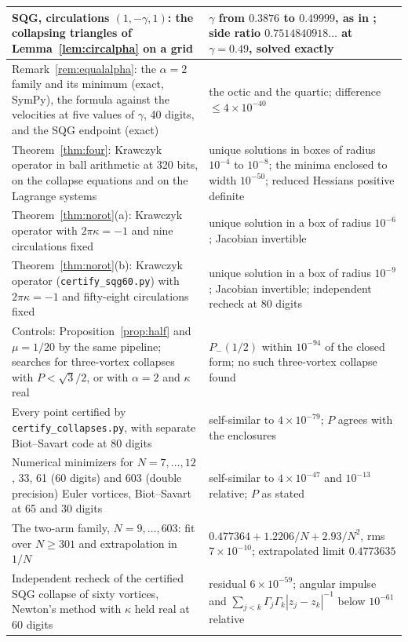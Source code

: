 \documentclass[11pt]{article}
\theoremstyle{definition}
\begin{document}
{\begin{longtable}{|>{\raggedright\arraybackslash}p{}|>{\raggedright\arraybackslash}p{}|}
  SQG, circulations $(1, -\gamma, 1)$: the collapsing triangles of Lemma~\ref{lem:circalpha} on a grid
    & $\gamma$ from $0.3876$ to $0.49999$, as in \cite[Lemma~1]{bb2018}; side ratio $0.7514840918\ldots$ at $\gamma = 0.49$, solved exactly \\ \hline
  Remark~\ref{rem:equalalpha}: the $\alpha = 2$ family and its minimum (exact, SymPy), the formula against the velocities at five values of $\gamma$, 40 digits, and the SQG endpoint (exact)
    & the octic and the quartic; difference $\le 4 \times 10^{-40}$ \\ \hline
  Theorem~\ref{thm:four}: Krawczyk operator in ball arithmetic at 320 bits, on the collapse equations and on the Lagrange systems
    & unique solutions in boxes of radius $10^{-4}$ to $10^{-8}$; the minima enclosed to width $10^{-50}$; reduced Hessians positive definite \\ \hline
  Theorem~\ref{thm:norot}(a): Krawczyk operator with $2\pi\kappa = -1$ and nine circulations fixed
    & unique solution in a box of radius $10^{-6}$; Jacobian invertible \\ \hline
  Theorem~\ref{thm:norot}(b): Krawczyk operator (\texttt{certify\_\allowbreak sqg60.py}) with $2\pi\kappa = -1$ and fifty-eight circulations fixed
    & unique solution in a box of radius $10^{-9}$; Jacobian invertible; independent recheck at 80 digits \\ \hline
  Controls: Proposition~\ref{prop:half} and $\mu = 1/20$ by the same pipeline; searches for three-vortex collapses with $P < \sqrt{3}/2$, or with $\alpha = 2$ and $\kappa$ real
    & $P_-(1/2)$ within $10^{-94}$ of the closed form; no such three-vortex collapse found \\ \hline
  Every point certified by \texttt{certify\_\allowbreak collapses.py}, with separate Biot--Savart code at 80 digits
    & self-similar to $4 \times 10^{-79}$; $P$ agrees with the enclosures \\ \hline
  Numerical minimizers for $N = 7, \dots, 12$, 33, 61 (60 digits) and 603 (double precision) Euler vortices, Biot--Savart at 65 and 30 digits
    & self-similar to $4 \times 10^{-47}$ and $10^{-13}$ relative; $P$ as stated \\ \hline
  The two-arm family, $N = 9, \dots, 603$: fit over $N \ge 301$ and extrapolation in $1/N$
    & $0.477364 + 1.2206/N + 2.93/N^2$, rms $7 \times 10^{-10}$; extrapolated limit $0.4773635$ \\ \hline
  Independent recheck of the certified SQG collapse of sixty vortices, Newton's method with $\kappa$ held real at 60 digits
    & residual $6 \times 10^{-59}$; angular impulse and $\sum_{j<k}\Gamma_j\Gamma_k|z_j - z_k|^{-1}$ below $10^{-61}$ relative \\ \hline
\end{longtable}
}
\end{document}
